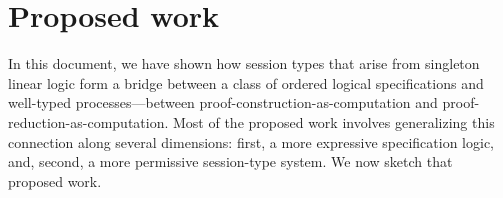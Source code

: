 












% 


% 

\section{Proposed work}\label{sec:proposed-work}

In this document, we have shown how session types that arise from singleton linear logic form a bridge between a class of ordered logical specifications and well-typed processes---between proof-construction-as-computation and proof-reduction-as-computation.
Most of the proposed work involves generalizing this connection along several dimensions: 
first, a more expressive specification logic,
and, second, a more permissive session-type system.
We now sketch that proposed work.



